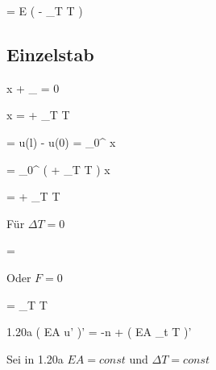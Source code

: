 \documentclass[11pt]{article}
\newcommand{\1}{ {\mathds{1}} }
\begin{document}
\begin{multicols*}{3}
		\begin{formel}{1.12}
			\sigma
			=
			E
			\left(
				\varepsilon
				-
				\alpha_T
				\Delta T
			\right)
		\end{formel}

		\subsection{Einzelstab}

		\begin{formel}{1.13}
					 {x}
			+
			_{}
			=
			0
		\end{formel}

		\begin{formel}{1.14}
					 {x}
			=
			+
			\alpha_T \Delta T
		\end{formel}

		\begin{formel}{1.15}
			\Delta \ell
			=
			u(l)
			-
			u(0)
			=
			\int_{0}^{\ell}
			\varepsilon
			x
		\end{formel}
		 

		\begin{formel}{1.16}
			\Delta \ell
			=
			\int_{0}^{\ell}
			\left(
				+
				\alpha_T \Delta T
			\right)
			x
		\end{formel}

		\begin{formel}{1.17}
			\Delta \ell
			=
			+
			\alpha_T \Delta T \ell
		\end{formel}

		Für $\Delta T = 0$

		\begin{formel}{1.18}
			\Delta \ell
			=
		\end{formel}

		Oder $F = 0$

		\begin{formel}{1.19}
			\Delta \ell
			=
			\alpha_T \Delta T \ell
		\end{formel}

		\begin{formel}{1.20a}
			\left(
				EA u'
			\right)'
			=
			-n
			+
			\left(
				EA \alpha_t \Delta T
			\right)'
		\end{formel}

		Sei in 1.20a $EA = const$ und $\Delta T = const$


\end{multicols*}
\end{document}
